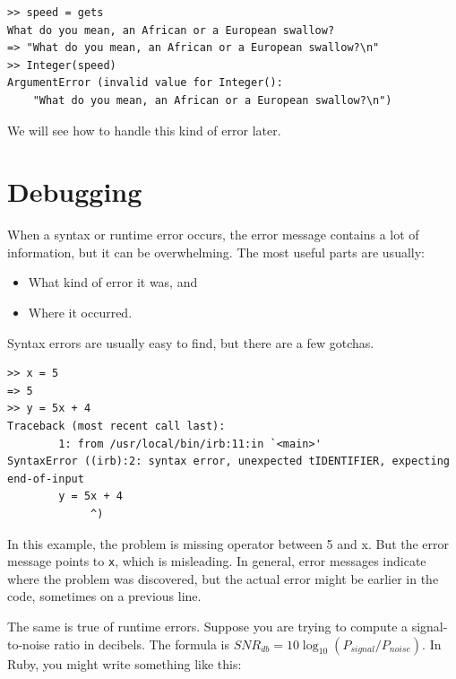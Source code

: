 \documentclass[10pt]{book}
\begin{document}
\begin{verbatim}
>> speed = gets
What do you mean, an African or a European swallow?
=> "What do you mean, an African or a European swallow?\n"
>> Integer(speed)
ArgumentError (invalid value for Integer():
    "What do you mean, an African or a European swallow?\n")
\end{verbatim}
%
We will see how to handle this kind of error later.


\section{Debugging}

When a syntax or runtime error occurs, the error message contains
a lot of information, but it can be overwhelming.  The most
useful parts are usually:

\begin{itemize}

\item What kind of error it was, and

\item Where it occurred.

\end{itemize}

Syntax errors are usually easy to find, but there are a few
gotchas.

\begin{verbatim}
>> x = 5
=> 5
>> y = 5x + 4
Traceback (most recent call last):
        1: from /usr/local/bin/irb:11:in `<main>'
SyntaxError ((irb):2: syntax error, unexpected tIDENTIFIER, expecting end-of-input
        y = 5x + 4
             ^)
\end{verbatim}
%
In this example, the problem is missing operator between
5 and x.  But the error message points to {\tt x}, which is
misleading.  In general, error messages indicate where the problem was
discovered, but the actual error might be earlier in the code,
sometimes on a previous line.

The same is true of runtime errors.  Suppose you are trying
to compute a signal-to-noise ratio in decibels.  The formula
is $SNR_{db} = 10 \log_{10} (P_{signal} / P_{noise})$.  In Ruby,
you might write something like this:
\end{document}
